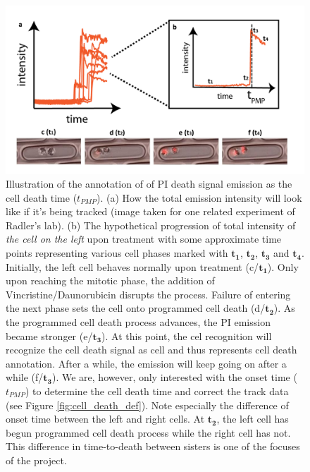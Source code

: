 \documentclass[pdftex,12pt,a4paper]{report}
\begin{document}
\begin{figure}[H]
\centering
\includegraphics[width=\textwidth]{images/cell_death_detection}
\caption[Illustration of annotation of PI death signal]{Illustration of the annotation of of PI death signal emission as the cell death time ($t_{PMP}$). (a) How the total emission intensity will look like if it's being tracked (image taken for one related experiment of Radler's lab). (b) The hypothetical progression of total intensity of \textit{the cell on the left} upon treatment with some approximate time points representing various cell phases marked with $\mathbf{t_1}$, $\mathbf{t_2}$, $\mathbf{t_3}$ and $\mathbf{t_4}$. Initially, the left cell behaves normally upon treatment (c/$\mathbf{t_1}$). Only upon reaching the mitotic phase, the addition of Vincristine/Daunorubicin disrupts the process. Failure of entering the next phase sets the cell onto programmed cell death (d/$\mathbf{t_2}$). As the programmed cell death process advances, the PI emission became stronger (e/$\mathbf{t_3}$). At this point, the cel recognition will recognize the cell death signal as cell and thus represents cell death annotation. After a while, the emission will keep going on after a while (f/$\mathbf{t_3}$). We are, however, only interested with the onset time ($t_{PMP}$) to determine the cell death time and correct the track data (see Figure \ref{fig:cell_death_def}). Note especially the difference of onset time between the left and right cells. At $\mathbf{t_2}$, the left cell has begun programmed cell death process while the right cell has not. This difference in time-to-death between sisters is one of the focuses of the project.
}
\label{fig:cell_death_determination_example}
\end{figure}

\end{document}
